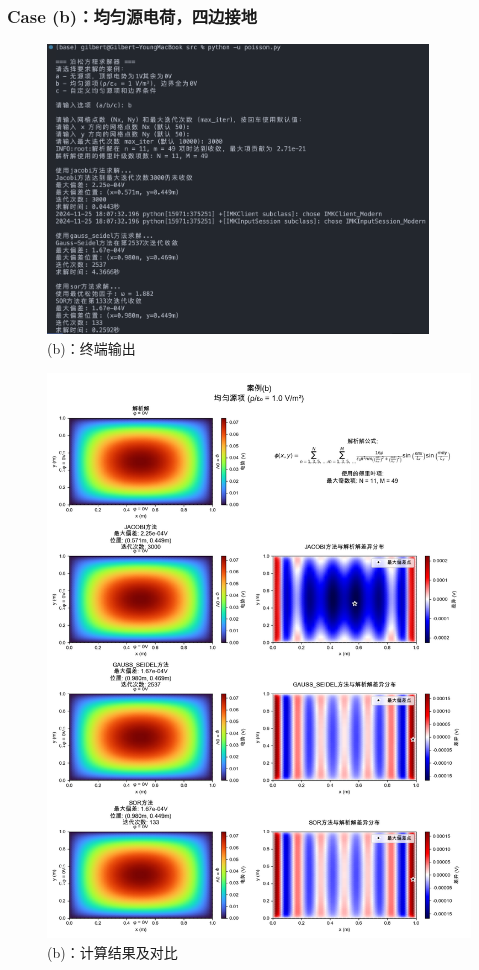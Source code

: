 \subsubsection{Case (b)：均匀源电荷，四边接地}
\begin{figure}[H]
    \centering
    \includegraphics[width=0.9\textwidth]{Problem_1/figs/b_terminal.png}
    \caption{(b)：终端输出}
\end{figure}

\begin{figure}[H]
    \centering
    \includegraphics[width=1.0\textwidth]{Problem_1/figs/b_result.png}
    \caption{(b)：计算结果及对比}
\end{figure}

